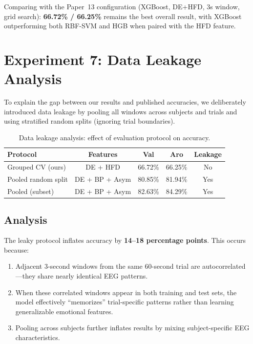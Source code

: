 \documentclass[12pt,a4paper]{report}
\begin{document}
\noindent
Comparing with the Paper~13 configuration (XGBoost, DE+HFD, 3s window, grid
search): \textbf{66.72\% / 66.25\%} remains the best overall result, with
XGBoost outperforming both RBF-SVM and HGB when paired with the HFD feature.


\section{Experiment 7: Data Leakage Analysis}
\label{sec:leakage}

To explain the gap between our results and published accuracies, we
deliberately introduced data leakage by pooling all windows across subjects
and trials and using stratified random splits (ignoring trial boundaries).

\begin{table}[H]
\centering
\caption{Data leakage analysis: effect of evaluation protocol on accuracy.}
\label{tab:leakage}
\begin{tabular}{lcccc}
\toprule
\textbf{Protocol} & \textbf{Features} & \textbf{Val} & \textbf{Aro} & \textbf{Leakage} \\
\midrule
Grouped CV (ours)  & DE + HFD       & 66.72\% & 66.25\% & No \\
Pooled random split & DE + BP + Asym & 80.85\% & 81.94\% & Yes \\
Pooled (subset)    & DE + BP + Asym & 82.63\% & 84.29\% & Yes \\
\bottomrule
\end{tabular}
\end{table}

\subsection{Analysis}

The leaky protocol inflates accuracy by \textbf{14--18 percentage points}.
This occurs because:

\begin{enumerate}[noitemsep]
    \item Adjacent 3-second windows from the same 60-second trial are
          autocorrelated---they share nearly identical EEG patterns.
    \item When these correlated windows appear in both training and test sets,
          the model effectively ``memorizes'' trial-specific patterns rather
          than learning generalizable emotional features.
    \item Pooling across subjects further inflates results by mixing
          subject-specific EEG characteristics.
\end{enumerate}
\end{document}
